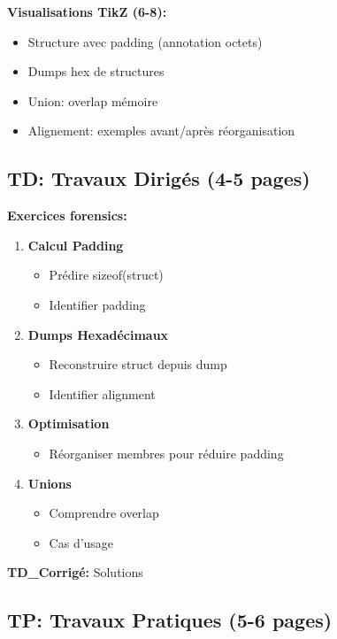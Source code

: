 \documentclass[10pt,a4paper]{article}
\begin{document}
\textbf{Visualisations TikZ (6-8):}
\begin{itemize}
\item Structure avec padding (annotation octets)
\item Dumps hex de structures
\item Union: overlap mémoire
\item Alignement: exemples avant/après réorganisation
\end{itemize}

\subsection*{TD: Travaux Dirigés (4-5 pages)}

\textbf{Exercices forensics:}
\begin{enumerate}
\item \textbf{Calcul Padding}
   \begin{itemize}
   \item Prédire sizeof(struct)
   \item Identifier padding
   \end{itemize}

\item \textbf{Dumps Hexadécimaux}
   \begin{itemize}
   \item Reconstruire struct depuis dump
   \item Identifier alignment
   \end{itemize}

\item \textbf{Optimisation}
   \begin{itemize}
   \item Réorganiser membres pour réduire padding
   \end{itemize}

\item \textbf{Unions}
   \begin{itemize}
   \item Comprendre overlap
   \item Cas d'usage
   \end{itemize}
\end{enumerate}

\textbf{TD\_Corrigé:} Solutions

\subsection*{TP: Travaux Pratiques (5-6 pages)}
\end{document}
